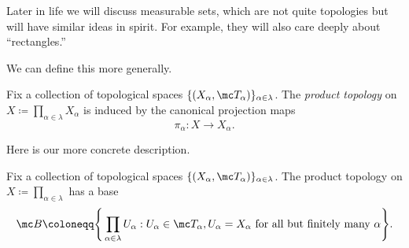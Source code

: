 \documentclass[../notes.tex]{subfiles}
\begin{document}
\begin{remark}
	Later in life we will discuss measurable sets, which are not quite topologies but will have similar ideas in spirit. For example, they will also care deeply about ``rectangles.''
\end{remark}
We can define this more generally.
\begin{defihelper} 
	Fix a collection of topological spaces $\{(X_\alpha,\mc T_\alpha)\}_{\alpha\in\lambda}$. The \textit{product topology} on $X\coloneqq\prod_{\alpha\in\lambda}X_\alpha$ is induced by the canonical projection maps
	\[\pi_\alpha\colon X\to X_\alpha.\]
\end{defihelper}
Here is our more concrete description.
\begin{lemma} \label{lem:prodtopbase}
	Fix a collection of topological spaces $\{(X_\alpha,\mc T_\alpha)\}_{\alpha\in\lambda}$. The product topology on $X\coloneqq\prod_{\alpha\in\lambda}$ has a base
	\[\mc B\coloneqq\Bigg\{\prod_{\alpha\in\lambda}U_\alpha:U_\alpha\in\mc T_\alpha,U_\alpha=X_\alpha\text{ for all but finitely many }\alpha\Bigg\}.\]
\end{lemma}
\end{document}
